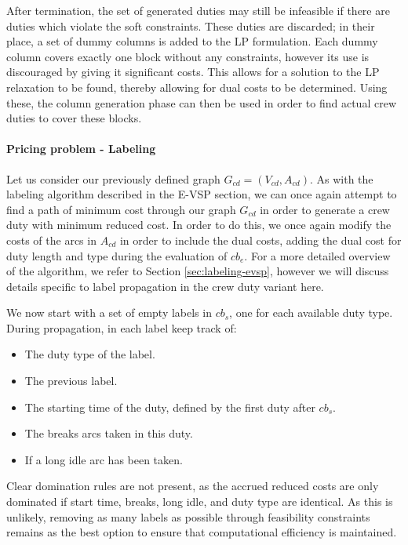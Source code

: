 \documentclass[]{article}
\begin{document}
\noindent After termination, the set of generated duties may still be infeasible if there are duties which violate the soft constraints. These duties are discarded; in their place, a set of dummy columns is added to the LP formulation. Each dummy column covers exactly one block without any constraints, however its use is discouraged by giving it significant costs. This allows for a solution to the LP relaxation to be found, thereby allowing for dual costs to be determined. Using these, the column generation phase can then be used in order to find actual crew duties to cover these blocks.

\paragraph{Pricing problem - Labeling}
Let us consider our previously defined graph $G_{cd} = (V_{cd}, A_{cd})$. As with the labeling algorithm described in the E-VSP section, we can once again attempt to find a path of minimum cost through our graph $G_{cd}$ in order to generate a crew duty with minimum reduced cost. In order to do this, we once again modify the costs of the arcs in $A_{cd}$ in order to include the dual costs, adding the dual cost for duty length and type during the evaluation of $cb_e$. For a more detailed overview of the algorithm, we refer to Section \ref{sec:labeling-evsp}, however we will discuss details specific to label propagation in the crew duty variant here. 

We now start with a set of empty labels in $cb_s$, one for each available duty type. During propagation, in each label keep track of:
\begin{itemize}
  \item The duty type of the label.
  \item The previous label.
  \item The starting time of the duty, defined by the first duty after $cb_s$.
  \item The breaks arcs taken in this duty.
  \item If a long idle arc has been taken.
\end{itemize}
Clear domination rules are not present, as the accrued reduced costs are only dominated if start time, breaks, long idle, and duty type are identical. As this is unlikely, removing as many labels as possible through feasibility constraints remains as the best option to ensure that computational efficiency is maintained.
\end{document}
